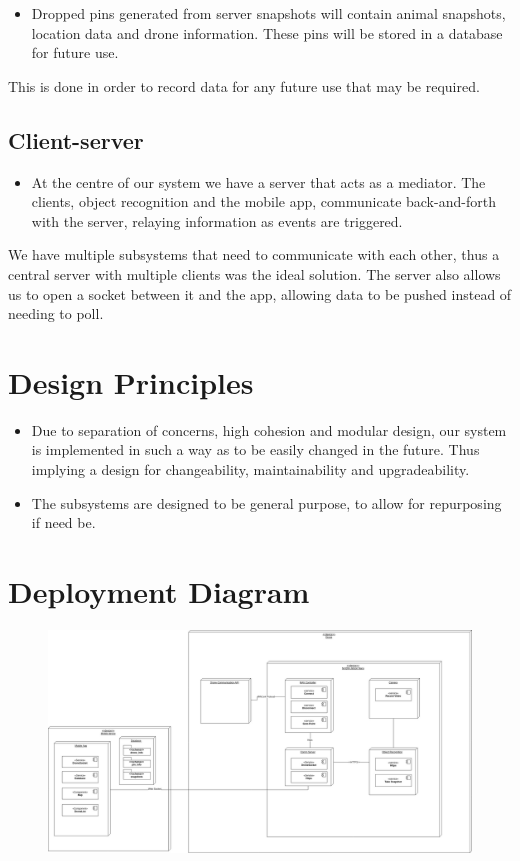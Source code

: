 \begin{itemize}
	\item Dropped pins generated from server snapshots will contain animal snapshots, location data and drone information. 
	These pins will be stored in a database for future use.
\end{itemize}
This is done in order to record data for any future use that may be required.

\subsection{Client-server}

\begin{itemize}
	\item At the centre of our system we have a server that acts as a mediator. The clients, object recognition and the mobile app, 
	communicate back-and-forth with the server, relaying information as events are triggered.
\end{itemize}
We have multiple subsystems that need to communicate with each other, thus a central server with multiple clients was the ideal solution.
The server also allows us to open a socket between it and the app, allowing data to be pushed instead of needing to poll.

\section{Design Principles}

\begin{itemize}
	\item Due to separation of concerns, high cohesion and modular design, our system is implemented in such a way as to be easily changed in the future.
	Thus implying a design for changeability, maintainability and upgradeability.
	\item The subsystems are designed to be general purpose, to allow for repurposing if need be. 
\end{itemize}

\section{Deployment Diagram}

\begin{figure}
    \centering
		\includegraphics[scale=0.3]{./assets/images/deployment-diagram.jpg}
    \label{fig:awesome_image}
\end{figure}


